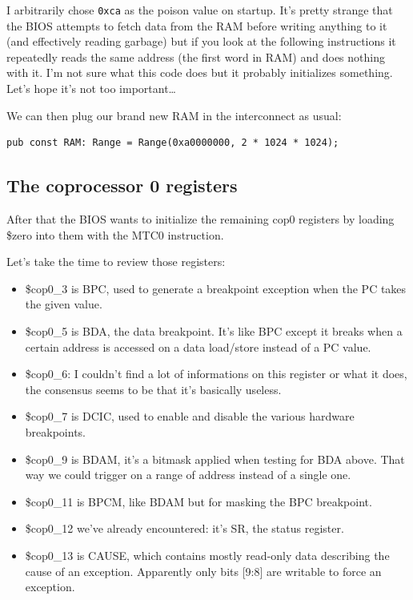 \documentclass[a4paper]{article}
\newcommand{\code}[1] {\texttt{#1}}
\begin{document}
I arbitrarily chose \code{0xca} as the poison value on startup. It's pretty
strange that the BIOS attempts to fetch data from the RAM before
writing anything to it (and effectively reading garbage) but if you
look at the following instructions it repeatedly reads the same
address (the first word in RAM) and does nothing with it. I'm not sure
what this code does but it probably initializes something. Let's hope
it's not too important\dots{}

We can then plug our brand new RAM in the interconnect as usual:

\begin{lstlisting}
pub const RAM: Range = Range(0xa0000000, 2 * 1024 * 1024);
\end{lstlisting}

\subsection{The coprocessor 0 registers}

After that the BIOS wants to initialize the remaining cop0 registers
by loading \$zero into them with the MTC0 instruction.

Let's take the time to review those registers:

\begin{itemize}
\item \$cop0\_3 is BPC, used to generate a breakpoint exception when the
  PC takes the given value.

\item \$cop0\_5 is BDA, the data breakpoint. It's like BPC except it
  breaks when a certain address is accessed on a data load/store instead
  of a PC value.

\item \$cop0\_6: I couldn't find a lot of informations on this
  register or what it does, the consensus seems to be that it's
  basically useless.

\item \$cop0\_7 is DCIC, used to enable and disable the various
  hardware breakpoints.

\item \$cop0\_9 is BDAM, it's a bitmask applied when testing for BDA
  above. That way we could trigger on a range of address instead of a
  single one.

\item \$cop0\_11 is BPCM, like BDAM but for masking the BPC
  breakpoint.

\item \$cop0\_12 we've already encountered: it's SR, the status register.

\item \$cop0\_13 is CAUSE, which contains mostly read-only data
  describing the cause of an exception. Apparently only bits [9:8] are
  writable to force an exception.
\end{itemize}
\end{document}
